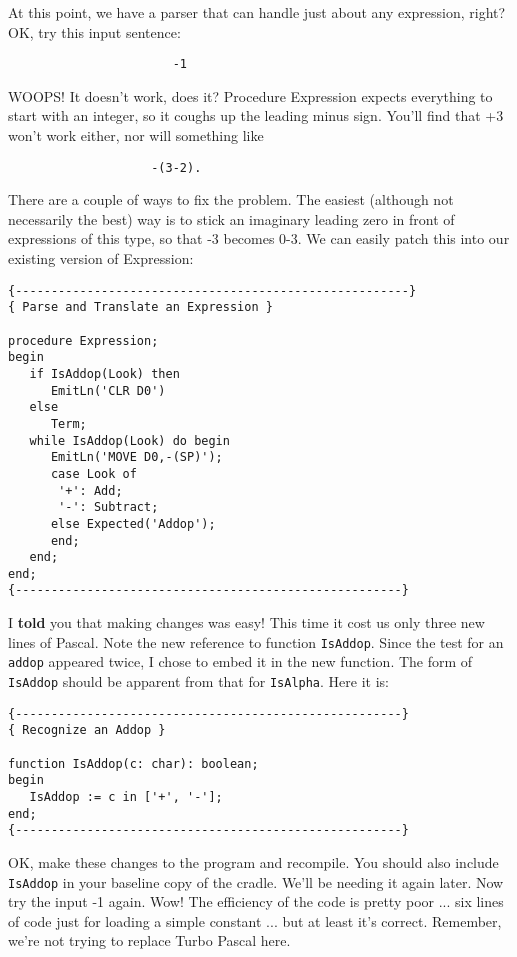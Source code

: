 At  this  point, we have a parser that can handle just about any expression, right?  OK, try this input sentence:

\begin{verbatim}
                       -1
\end{verbatim}

WOOPS!  It doesn't work, does it?   Procedure  Expression expects everything to start with an integer, so it coughs up  the leading minus  sign. You'll find that +3 won't  work  either, nor  will something like

\begin{verbatim}
                    -(3-2).
\end{verbatim}

There  are  a  couple of ways to fix the problem. The  easiest (although not necessarily the best)  way is to stick an imaginary leading zero in  front  of  expressions  of this type, so that -3 becomes 0-3. We can easily patch this into our  existing version of Expression:

\begin{verbatim}
{-------------------------------------------------------}
{ Parse and Translate an Expression }

procedure Expression;
begin
   if IsAddop(Look) then
      EmitLn('CLR D0')
   else
      Term;
   while IsAddop(Look) do begin
      EmitLn('MOVE D0,-(SP)');
      case Look of
       '+': Add;
       '-': Subtract;
      else Expected('Addop');
      end;
   end;
end;
{------------------------------------------------------}
\end{verbatim}

I {\bfseries told} you that making changes  was  easy!   This time it cost us only  three  new lines of Pascal. Note  the  new  reference  to function {\tt IsAddop}. Since the test for an {\tt addop} appeared  twice, I chose  to  embed  it in the new function. The  form  of  {\tt IsAddop} should be apparent from that for {\tt IsAlpha}. Here it is:

\begin{verbatim}
{------------------------------------------------------}
{ Recognize an Addop }

function IsAddop(c: char): boolean;
begin
   IsAddop := c in ['+', '-'];
end;
{------------------------------------------------------}
\end{verbatim}

OK, make these changes to the program and recompile. You should also include {\tt IsAddop} in your baseline copy of the cradle. We'll be needing  it  again  later. Now try the input -1 again. Wow!  The efficiency of the code is  pretty  poor ... six lines of code just for loading a simple constant ... but at least it's correct. Remember, we're not trying to replace Turbo Pascal here.

